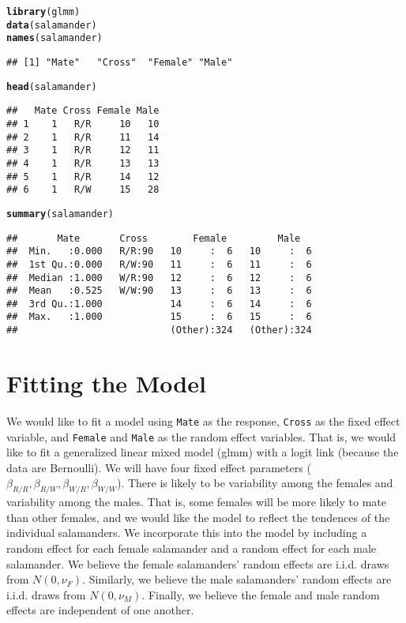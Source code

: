 \documentclass[11pt]{article}\usepackage[]{graphicx}\usepackage[]{color}
\makeatletter
\newcommand{\hlstd}[1]{\textcolor[rgb]{0.345,0.345,0.345}{#1}}%
\newcommand{\hlkwd}[1]{\textcolor[rgb]{0.737,0.353,0.396}{\textbf{#1}}}%
\newenvironment{kframe}{%
 \def\at@end@of@kframe{}%
 \ifinner\ifhmode%
  \def\at@end@of@kframe{\end{minipage}}%
  \begin{minipage}{\columnwidth}%
 \fi\fi%
 \def\FrameCommand##1{\hskip\@totalleftmargin \hskip-\fboxsep
 \colorbox{shadecolor}{##1}\hskip-\fboxsep
     \hskip-\linewidth \hskip-\@totalleftmargin \hskip\columnwidth}%
 \MakeFramed {\advance\hsize-\width
   \@totalleftmargin\z@ \linewidth\hsize
   \@setminipage}}%
 {\par\unskip\endMakeFramed%
 \at@end@of@kframe}
\newenvironment{knitrout}{}{} %
\makeatother
\begin{document}
\begin{knitrout}
\color{fgcolor}\begin{kframe}
\begin{alltt}
\hlkwd{library}\hlstd{(glmm)}
\hlkwd{data}\hlstd{(salamander)}
\hlkwd{names}\hlstd{(salamander)}
\end{alltt}
\begin{verbatim}
## [1] "Mate"   "Cross"  "Female" "Male"
\end{verbatim}
\begin{alltt}
\hlkwd{head}\hlstd{(salamander)}
\end{alltt}
\begin{verbatim}
##   Mate Cross Female Male
## 1    1   R/R     10   10
## 2    1   R/R     11   14
## 3    1   R/R     12   11
## 4    1   R/R     13   13
## 5    1   R/R     14   12
## 6    1   R/W     15   28
\end{verbatim}
\begin{alltt}
\hlkwd{summary}\hlstd{(salamander)}
\end{alltt}
\begin{verbatim}
##       Mate       Cross        Female         Male    
##  Min.   :0.000   R/R:90   10     :  6   10     :  6  
##  1st Qu.:0.000   R/W:90   11     :  6   11     :  6  
##  Median :1.000   W/R:90   12     :  6   12     :  6  
##  Mean   :0.525   W/W:90   13     :  6   13     :  6  
##  3rd Qu.:1.000            14     :  6   14     :  6  
##  Max.   :1.000            15     :  6   15     :  6  
##                           (Other):324   (Other):324
\end{verbatim}
\end{kframe}
\end{knitrout}

\section{Fitting the Model}\label{sec:fitmod}

We would like to fit a model using \texttt{Mate} as the response, \texttt{Cross} as the fixed effect variable, and \texttt{Female} and \texttt{Male} as the random effect variables. That is, we would like to fit a generalized linear mixed model (glmm) with a logit link (because the data are Bernoulli). We will have four fixed effect parameters ($\beta_{R/R}, \beta_{R/W},\beta_{W/R},\beta_{W/W}$). There is likely to be variability among the females and variability among the males. That is, some females will be more likely to mate than other females, and we would like the model to reflect the tendences of the individual salamanders. We incorporate this into the model by including a random effect for each female salamander and a random effect for each male salamander. We believe the female salamanders' random effects are i.i.d. draws from $N(0, \nu_F)$. Similarly, we believe the male salamanders' random effects are i.i.d. draws from $N(0,\nu_M)$. Finally, we believe the female and male random effects are independent of one another. \\
\end{document}
